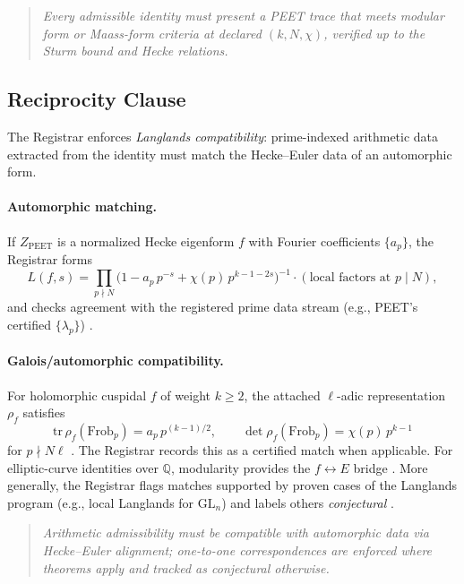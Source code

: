 \documentclass[12pt]{amsart}
\theoremstyle{plain}
\begin{document}
\begin{quote}
\textit{Every admissible identity must present a PEET trace that meets modular form or Maass-form criteria at declared $(k,N,\chi)$, verified up to the Sturm bound and Hecke relations.}
\end{quote}

\subsection{Reciprocity Clause}

The Registrar enforces \emph{Langlands compatibility}: prime-indexed arithmetic data extracted from the identity must match the Hecke–Euler data of an automorphic form.

\paragraph{Automorphic matching.}
If $Z_{\mathrm{PEET}}$ is a normalized Hecke eigenform $f$ with Fourier coefficients $\{a_p\}$, the Registrar forms
\[
L(f,s)=\prod_{p\nmid N}\Big(1-a_p\,p^{-s}+\chi(p)\,p^{k-1-2s}\Big)^{-1}\cdot(\text{local factors at }p\mid N),
\]
and checks agreement with the registered prime data stream (e.g., PEET’s certified $\{\lambda_p\}$) \cite{godement1972zeta,diamond2005first}.

\paragraph{Galois/automorphic compatibility.}
For holomorphic cuspidal $f$ of weight $k\ge2$, the attached $\ell$-adic representation $\rho_f$ satisfies
\[
\mathrm{tr}\,\rho_f(\mathrm{Frob}_p)=a_p\,p^{(k-1)/2},\qquad
\det\rho_f(\mathrm{Frob}_p)=\chi(p)\,p^{k-1}
\]
for $p\nmid N\ell$ \cite{deligne1971formes}. The Registrar records this as a certified match when applicable. For elliptic-curve identities over $\mathbb{Q}$, modularity provides the $f\leftrightarrow E$ bridge \cite{wiles1995modular,taylor1995ring}. More generally, the Registrar flags matches supported by proven cases of the Langlands program (e.g., local Langlands for $\mathrm{GL}_n$) and labels others \emph{conjectural} \cite{langlands1970problems,harris2001geometry}.

\begin{quote}
\textit{Arithmetic admissibility must be compatible with automorphic data via Hecke–Euler alignment; one-to-one correspondences are enforced where theorems apply and tracked as conjectural otherwise.}
\end{quote}
\end{document}
